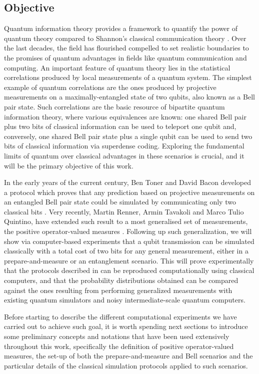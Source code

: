 \subsection{Objective}
Quantum information theory provides a framework to quantify the power of quantum theory compared to Shannon's classical communication theory \cite{shannon}. Over the last decades, the field has flourished compelled to set realistic boundaries to the promises of quantum advantages in fields like quantum communication and computing. An important feature of quantum theory lies in the statistical correlations produced by local measurements of a quantum system. The simplest example of quantum correlations are the ones produced by projective measurements on a maximally-entangled state of two qubits, also known as a Bell pair state. Such correlations are the basic resource of bipartite quantum information theory, where various equivalences are known: one shared Bell pair plus two bits of classical information can be used to teleport one  qubit and, conversely, one shared Bell pair state plus a single qubit can be used to send two bits of classical information via superdense coding. Exploring the fundamental limits of quantum over classical advantages in these scenarios is crucial, and it will be the primary objective of this work.
\par
In the early years of the current century, Ben Toner and David Bacon developed a protocol which proves that any prediction based on projective measurements on an entangled Bell pair state could be simulated by communicating only two classical bits \cite{toner2003}. Very recently, Martin Renner, Armin Tavakoli and Marco Tulio Quintino, have extended such result to a most generalised set of measurements, the positive operator-valued measures \cite{renner2022}.
Following up such generalization, we will show via computer-based experiments that a qubit transmission can be simulated classically with a total cost of two bits for any general measurement, either in a prepare-and-measure or an entanglement scenario. This will prove experimentally that the protocols described in \cite{renner2022} can be reproduced computationally using classical computers, and that the probability distributions obtained can be compared against the ones resulting from performing generalized measurements with existing quantum simulators and noisy intermediate-scale quantum computers.
\par
Before starting to describe the different computational experiments we have carried out to achieve such goal, it is worth spending next sections to introduce some preliminary concepts and notations that have been used extensively throughout this work, specifically the definition of positive operator-valued measures, the set-up of both the prepare-and-measure and Bell scenarios and the particular details of the classical simulation protocols applied to such scenarios.
\par
